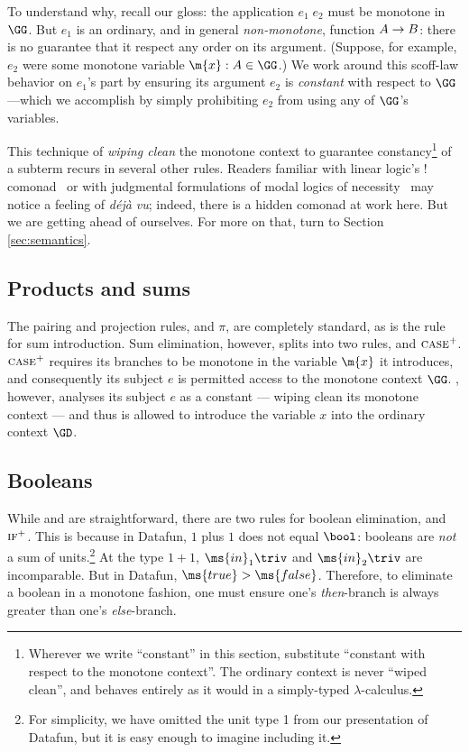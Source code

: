 To understand why, recall our gloss: the application $e_1\;e_2$ must be monotone
in $\GG$. But $e_1$ is an ordinary, and in general \emph{non-monotone}, function
$A \to B$: there is no guarantee that it respect any order on its argument.
(Suppose, for example, $e_2$ were some monotone variable $\m{x} : A \in \GG$.)
We work around this scoff-law behavior on $e_1$'s part by ensuring its argument
$e_2$ is \emph{constant} with respect to $\GG$---which we accomplish by simply
prohibiting $e_2$ from using any of $\GG$'s variables.

This technique of \emph{wiping clean} the monotone context to guarantee
constancy\footnote{Wherever we write ``constant'' in this section, substitute
  ``constant with respect to the monotone context''. The ordinary context is
  never ``wiped clean'', and behaves entirely as it would in a simply-typed
  $\lambda$-calculus.} of a subterm recurs in several other rules. Readers
familiar with linear logic's $!$ comonad~\cite{linearlogic} or with judgmental
formulations of modal logics of necessity~\cite{jrml} may notice a feeling of
\textit{d\'ej\`a vu}; indeed, there is a hidden comonad at work here. But we are
getting ahead of ourselves. For more on that, turn to Section
\ref{sec:semantics}.

\subsection{Products and sums}
The pairing and projection rules,  and $\pi$, are completely standard,
as is the  rule for sum introduction. Sum elimination, however, splits
into two rules,  and $\textsc{case}^+$. $\textsc{case}^+$ requires its branches
to be monotone in the variable $\m{x}$ it introduces, and consequently its
subject $e$ is permitted access to the monotone context $\GG$. ,
however, analyses its subject $e$ as a constant --- wiping clean its monotone
context --- and thus is allowed to introduce the variable $x$ into the ordinary
context $\GD$.


\subsection{Booleans}
\label{sec:typing-rules-booleans}

While  and  are straightforward, there are two rules for
boolean elimination,  and $\textsc{if}^+$. This is because in Datafun, $1$
plus $1$ does not equal $\bool$: booleans are \emph{not} a sum of
units.\footnote{For simplicity, we have omitted the unit type 1 from our
  presentation of Datafun, but it is easy enough to imagine including it.} At
the type $1 + 1$, $\ms{in}_1 \triv$ and $\ms{in}_2 \triv$ are incomparable. But
in Datafun, $\ms{true} > \ms{false}$. Therefore, to eliminate a boolean in a
monotone fashion, one must ensure one's \emph{then}-branch is always greater
than one's \emph{else}-branch.


